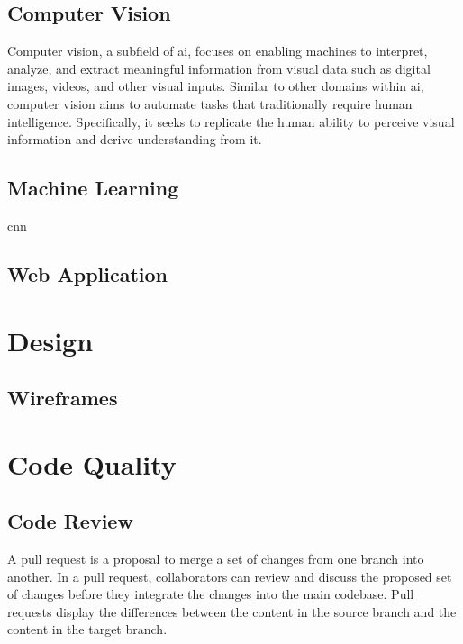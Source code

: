 \subsection{Computer Vision}

Computer vision, a subfield of \gls{ai}, focuses on enabling machines to interpret, analyze, and extract meaningful information from visual data such as digital images, videos, and other visual inputs. \cite{google:vision} Similar to other domains within \gls{ai}, computer vision aims to automate tasks that traditionally require human intelligence. Specifically, it seeks to replicate the human ability to perceive visual information and derive understanding from it. \cite{microsoft:vision}

\subsection{Machine Learning}

\gls{cnn}

\subsection{Web Application}

\section{Design}
\subsection{Wireframes}

\section{Code Quality}

\subsection{Code Review}

A pull request is a proposal to merge a set of changes from one branch into another. In a pull request, collaborators can review and discuss the proposed set of changes before they integrate the changes into the main codebase. Pull requests display the differences between the content in the source branch and the content in the target branch. \cite{github:pr} 

